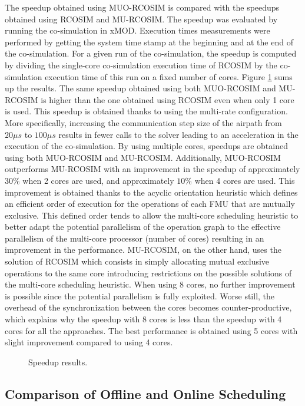 The speedup obtained using MUO-RCOSIM is compared with the speedups obtained using RCOSIM and MU-RCOSIM. The speedup was evaluated by running the co-simulation in xMOD. Execution times measurements were performed by getting the system time stamp at the beginning and at the end of the co-simulation. For a given run of the co-simulation, the speedup is computed by dividing the single-core co-simulation execution time of RCOSIM by the co-simulation execution time of this run on a fixed number of cores. Figure \ref{fig:spdup} sums up the results. The same speedup obtained using both MUO-RCOSIM and MU-RCOSIM is higher than the one obtained using RCOSIM even when only 1 core is used. This speedup is obtained thanks to using the multi-rate configuration. More specifically, increasing the communication step size of the airpath from $20 {\mu}s$ to $100 {\mu}s$ results in fewer calls to the solver leading to an acceleration in the execution of the co-simulation. By using multiple cores, speedups are obtained using both MUO-RCOSIM and MU-RCOSIM. Additionally, MUO-RCOSIM outperforms MU-RCOSIM with an improvement in the speedup of approximately $30\%$ when 2 cores are used, and approximately $10\%$ when 4 cores are used. This improvement is obtained thanks to the acyclic orientation heuristic which defines an efficient order of execution for the operations of each FMU that are mutually exclusive. This defined order tends to allow the multi-core scheduling heuristic to better adapt the potential parallelism of the operation graph to the effective parallelism of the multi-core processor (number of cores) resulting in an improvement in the performance. MU-RCOSIM, on the other hand, uses the solution of RCOSIM which consists in simply allocating mutual exclusive operations to the same core introducing restrictions on the possible solutions of the multi-core scheduling heuristic. When using 8 cores, no further improvement is possible since the potential parallelism is fully exploited. Worse still, the overhead of the synchronization between the cores becomes counter-productive, which explains why the speedup with 8 cores is less than the speedup with 4 cores for all the approaches. The best performance is obtained using 5 cores with slight improvement compared to using 4 cores. 

\begin{figure}[phbt]
\centering

\caption{Speedup results.}
\label{fig:spdup}
\end{figure}  

\subsection{Comparison of Offline and Online Scheduling}

